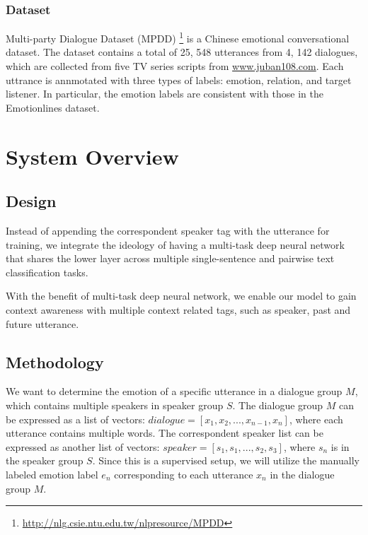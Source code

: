 \documentclass[11pt]{article}
\begin{document}
\subsubsection{Dataset}

Multi-party Dialogue Dataset (MPDD) \citep{chen-etal-2020-mpdd} \footnote{\url{http://nlg.csie.ntu.edu.tw/nlpresource/MPDD}} is a Chinese emotional conversational dataset. The dataset contains a total of 25, 548 utterances from 4, 142 dialogues, which are collected from five TV series scripts from \url{www.juban108.com}. Each uttrance is annmotated with three types of labels: emotion, relation, and target listener. In particular, the emotion labels are consistent with those in the Emotionlines dataset.


\section{System Overview}
\label{sec:overview}

\subsection{Design}

Instead of appending the correspondent speaker tag with the utterance for training, we integrate the ideology of having a multi-task deep neural network that shares the lower layer across multiple single-sentence and pairwise text classification tasks. 

With the benefit of multi-task deep neural network, we enable our model to gain context awareness with multiple context related tags, such as speaker, past and future utterance.

\subsection{Methodology}

We want to determine the emotion of a specific utterance in a dialogue group $M$, which contains multiple speakers in speaker group $S$. The dialogue group $M$ can be expressed as a list of vectors: $dialogue = [x_1, x_2, ..., x_{n-1}, x_n]$, where each utterance contains multiple words. The correspondent speaker list can be expressed as another list of vectors: $speaker = [s_1, s_1, ..., s_2, s_3]$, where $s_n$ is in the speaker group $S$. Since this is a supervised setup, we will utilize the manually labeled emotion label $e_n$ corresponding to each utterance $x_n$ in the dialogue group $M$.
\end{document}
